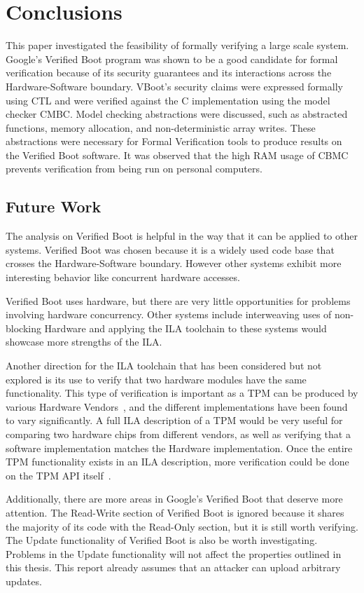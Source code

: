 \chapter{Conclusions}

This paper investigated the feasibility of formally verifying a large scale system.
Google's Verified Boot program was shown to be a good candidate for formal verification because of its security guarantees and its interactions across the Hardware-Software boundary.
VBoot's security claims were expressed formally using CTL and were verified against the C implementation using the model checker CMBC\@. 
Model checking abstractions were discussed, such as abstracted functions, memory
allocation, and non-deterministic array writes.
These abstractions were necessary for Formal Verification tools to produce
results on the Verified Boot software.
It was observed that the high RAM usage of CBMC prevents verification from being run on personal computers.

\section{Future Work}

The analysis on Verified Boot is helpful in the way that it can be applied to
other systems. 
Verified Boot was chosen because it is a widely used code base
that crosses the Hardware-Software boundary. 
However other systems exhibit more interesting behavior like concurrent hardware accesses.

Verified Boot uses hardware, but there are very little opportunities for
problems involving hardware concurrency.
Other systems include interweaving uses of non-blocking
Hardware\cite{load-protocol} and applying the ILA toolchain to these systems would showcase more strengths of the ILA.

Another direction for the ILA toolchain that has been considered but not explored
is its use to verify that two hardware modules have the same functionality.
This type of verification  is important as a TPM can be produced by various Hardware
Vendors~\cite{atmel-tpm}\cite{broadcom-tpm}\cite{infineon-tpm}, and the different 
implementations have been found to vary significantly\cite{tcg-inside}.
A full ILA description of a TPM would be very useful for comparing two hardware
chips from different vendors, as well as verifying that a software
implementation matches the Hardware implementation. 
Once the entire TPM functionality exists in an ILA description, more
verification could be done on the TPM API
itself~\cite{TPM-state}\cite{TPM-spec-verif}.

Additionally, there are more areas in Google's Verified Boot that
deserve more attention. 
The Read-Write section of Verified Boot is ignored because it shares the
majority of its code with the Read-Only section, but it is still worth verifying. 
The Update functionality of Verified Boot is also be worth investigating.
Problems in the Update functionality will not affect the properties outlined in this thesis.
This report already assumes that an attacker can upload arbitrary updates.
